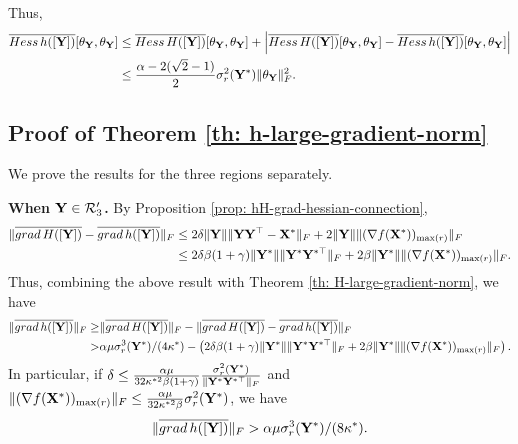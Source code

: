 \documentclass[11pt]{article}
\newcommand{\0}{{\mathbf{0}}}
\newcommand{\1}{{\mathbf{1}}}
\newcommand{\X}{{\mathbf{X}}}
\newcommand{\Y}{{\mathbf{Y}}}
\newcommand{\cR}{{\cal R}}
\newcommand{\Hess}{{\rm Hess}}
\newcommand{\grad}{{\rm grad}}
\newcommand{\F}{{\rm F}}
\begin{document}
	Thus,
\begin{equation*}
	\begin{split}
		 \overline{\Hess\, h([\Y])}[\theta_\Y, \theta_\Y] &\leq  \overline{\Hess\, H([\Y])}[\theta_\Y, \theta_\Y] + \left| \overline{\Hess\, H([\Y])}[\theta_\Y, \theta_\Y] - \overline{\Hess\, h([\Y])}[\theta_\Y, \theta_\Y]  \right| \\
		 & \leq  \frac{\alpha - 2 ( \sqrt{2} - 1 )}{2}  \sigma^2_r(\Y^*) \|\theta_\Y\|_\F^2.
	\end{split}
\end{equation*}

\subsection{Proof of Theorem \ref{th: h-large-gradient-norm}}
	We prove the results for the three regions separately.
	
{\bf When $\Y \in \cR_3'$.} By Proposition \ref{prop: hH-grad-hessian-connection},
\begin{equation*}
	\begin{split}
		\| \overline{\grad\, H([\Y])} - \overline{\grad\, h([\Y])}  \|_\F & \leq  2 \delta \|\Y\| \|\Y\Y^\top - \X^*\|_\F + 2 \|\Y\| \| ( \nabla f(\X^*) )_{\max(r)} \|_\F \\
		& \leq 2 \delta \beta ( 1 + \gamma) \|\Y^*\| \| \Y^* \Y^{*\top} \|_\F + 2 \beta \|\Y^*\| \| ( \nabla f(\X^*) )_{\max(r)} \|_\F.  
	\end{split}
\end{equation*} Thus, combining the above result with Theorem \ref{th: H-large-gradient-norm}, we have
\begin{equation*}
\begin{split}
	\|\overline{\grad\, h([\Y])} \|_\F \geq & \| \overline{\grad\, H([\Y])} \|_\F - \| \overline{\grad\, H([\Y])} - \overline{\grad\, h([\Y])}  \|_\F \\
	> &  \alpha \mu \sigma^3_r(\Y^*)/(4\kappa^*) - \left( 2 \delta \beta ( 1 + \gamma) \|\Y^*\| \| \Y^* \Y^{*\top} \|_\F + 2 \beta \|\Y^*\| \| ( \nabla f(\X^*) )_{\max(r)} \|_\F \right).  
\end{split}
\end{equation*}
In particular, if $\delta \leq \frac{\alpha \mu }{32 \kappa^{*2} \beta (1 + \gamma) } \frac{\sigma_r^2(\Y^*)}{ \| \Y^* \Y^{*\top} \|_\F }  $ and $\| ( \nabla f(\X^*) )_{\max(r)} \|_\F \leq \frac{\alpha \mu}{32 \kappa^{*2} \beta } \sigma^2_r(\Y^*) $, we have
\begin{equation} \label{ineq: h-gradient-bound-1}
	\|\overline{\grad\, h([\Y])} \|_\F > \alpha\mu \sigma^3_r(\Y^*)/ (8 \kappa^* ).
\end{equation}
\end{document}

